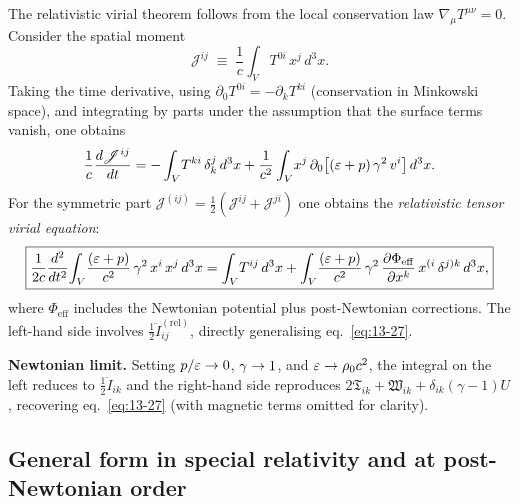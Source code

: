 The relativistic virial theorem follows from the local conservation
law $\nabla_{\mu}T^{\mu\nu} = 0$.  Consider the spatial moment
\begin{equation}
\label{eq:rel-13-moment}
\mathscr{J}^{ij}
  \;\equiv\; \frac{1}{c}\int_{V}\!T^{0i}\,x^{j}\,d^{3}x.
\end{equation}
Taking the time derivative, using $\partial_{0}T^{0i} =
-\partial_{k}T^{ki}$ (conservation in Minkowski space), and
integrating by parts under the assumption that the surface terms
vanish, one obtains
\begin{equation}
\label{eq:rel-13-dJ}
\frac{1}{c}\frac{d\mathscr{J}^{ij}}{dt}
  = -\int_{V}\!T^{ki}\,\delta^{j}_{k}\,d^{3}x
  + \frac{1}{c^{2}}\int_{V}\!x^{j}\,\partial_{0}
    \bigl[(\varepsilon + p)\,\gamma^{2}\,v^{i}\bigr]\,d^{3}x.
\end{equation}
For the symmetric part $\mathscr{J}^{(ij)} =
\tfrac{1}{2}(\mathscr{J}^{ij}+\mathscr{J}^{ji})$ one obtains the
\emph{relativistic tensor virial equation}:
\begin{equation}
\label{eq:rel-13-tensorvirial}
\boxed{
\frac{1}{2c}\frac{d^{2}}{dt^{2}}\!\int_{V}\!
  \frac{(\varepsilon + p)}{c^{2}}\,\gamma^{2}\,x^{i}\,x^{j}\,d^{3}x
= \int_{V}\!T^{ij}\,d^{3}x
  + \int_{V}\!\frac{(\varepsilon + p)}{c^{2}}\,\gamma^{2}\,
    \frac{\partial\Phi_{\mathrm{eff}}}{\partial x^{k}}\,
    x^{(i}\,\delta^{j)k}\,d^{3}x,
}
\end{equation}
where $\Phi_{\mathrm{eff}}$ includes the Newtonian potential plus
post-Newtonian corrections.  The left-hand side involves
$\tfrac{1}{2}\ddot{I}_{ij}^{(\mathrm{rel})}$, directly
generalising eq.~\eqref{eq:13-27}.

\begin{relcorrection}
\textbf{Newtonian limit.}
Setting $p/\varepsilon \to 0$, $\gamma \to 1$, and
$\varepsilon \to \rho_0 c^{2}$, the integral on the left reduces to
$\tfrac{1}{2}\ddot{I}_{ik}$ and the right-hand side reproduces
$2\mathfrak{T}_{ik} + \mathfrak{W}_{ik} + \delta_{ik}(\gamma-1)U$,
recovering eq.~\eqref{eq:13-27} (with magnetic terms omitted for
clarity).
\end{relcorrection}


\subsection{General form in special relativity and at post-Newtonian order}
\label{sec:rel-117-PN}

